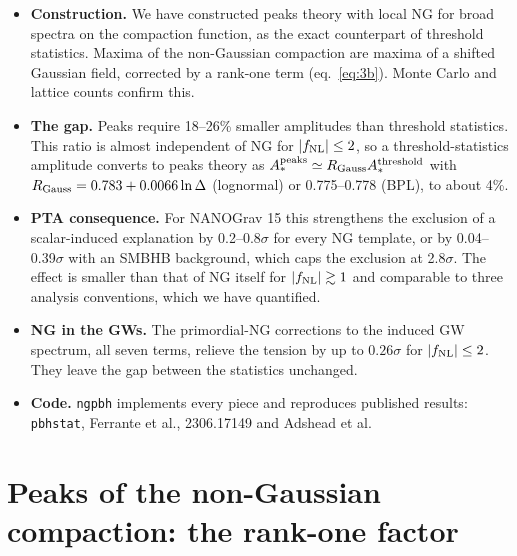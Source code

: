 \documentclass[11pt,a4paper]{article}
\newcommand{\fnl}{f_{\rm NL}}
\begin{document}
\begin{itemize}
\item \textbf{Construction.} We have constructed peaks theory with local NG for broad spectra on
the compaction function, as the exact counterpart of threshold statistics. Maxima of the
non-Gaussian compaction are maxima of a shifted Gaussian field, corrected by a rank-one term
(eq.~\ref{eq:3b}). Monte Carlo and lattice counts confirm this.
\item \textbf{The gap.} Peaks require 18--26\% smaller amplitudes than threshold statistics. This
ratio is almost independent of NG for $|\fnl|\le2$, so a threshold-statistics amplitude converts to
peaks theory as $A_*^{\rm peaks}\simeq R_{\rm Gauss}A_*^{\rm threshold}$ with
$R_{\rm Gauss}=0.783+0.0066\ln\Delta$ (lognormal) or 0.775--0.778 (BPL), to about 4\%.
\item \textbf{PTA consequence.} For NANOGrav 15 this strengthens the exclusion of a
scalar-induced explanation by 0.2--0.8$\sigma$ for every NG template, or by 0.04--0.39$\sigma$
with an SMBHB background, which caps the exclusion at 2.8$\sigma$. The effect is smaller than
that of NG itself for $|\fnl|\gtrsim1$ and comparable to three analysis conventions, which we
have quantified.
\item \textbf{NG in the GWs.} The primordial-NG corrections to the induced GW spectrum, all seven
terms, relieve the tension by up to $0.26\sigma$ for $|\fnl|\le2$. They leave the gap between the
statistics unchanged.
\item \textbf{Code.} \texttt{ngpbh} implements every piece and reproduces published results:
\texttt{pbhstat}, Ferrante et al., 2306.17149 and Adshead et al.
\end{itemize}

\appendix

\section{Peaks of the non-Gaussian compaction: the rank-one factor}\label{app:3b}
\end{document}
